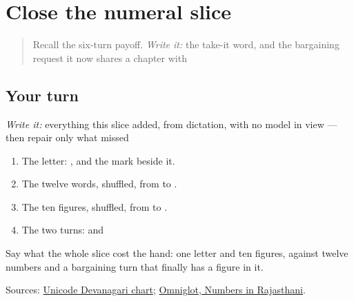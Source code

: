 \section[Practice]{Close the numeral slice}

\label{lesson:MW-R36-script-close}



\begin{quote}
Recall the six-turn payoff. \emph{Write it:} the take-it word, and the bargaining request it now shares a chapter with
\end{quote}

\subsection*{Your turn}
\emph{Write it:} everything this slice added, from dictation, with no model in view — then repair only what missed

\begin{enumerate}
\raggedright
  \item The letter: \textbf{}, and the mark \textbf{} beside it.
  \item The twelve words, shuffled, from \textbf{} to \textbf{}.
  \item The ten figures, shuffled, from \textbf{} to \textbf{}.
  \item The two turns: \textbf{} and \textbf{ }
\end{enumerate}

Say what the whole slice cost the hand: one letter and ten figures, against twelve numbers and a bargaining turn that finally has a figure in it.

\begin{tcolorbox}[breakable,colback=teal!4,colframe=teal!35!black,title={Before you move on}]
Sources: \href{https://www.unicode.org/charts/PDF/U0900.pdf}{Unicode Devanagari chart}; \href{https://www.omniglot.com/language/numbers/rajasthani.htm}{Omniglot, Numbers in Rajasthani}.
\end{tcolorbox}
